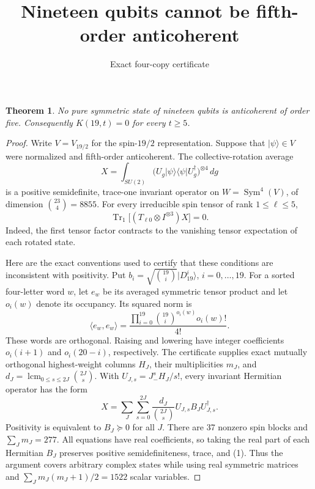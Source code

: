 \documentclass[11pt]{article}
\newtheorem{theorem}{Theorem}
\newcommand{\Tr}{\operatorname{Tr}}
\begin{document}
\title{Nineteen qubits cannot be fifth-order anticoherent}
\author{Exact four-copy certificate}
\date{}
\maketitle
\begin{theorem}
No pure symmetric state of nineteen qubits is anticoherent of order five.
Consequently $K(19,t)=0$ for every $t\geq5$.
\end{theorem}
\begin{proof}
Write $V=V_{19/2}$ for the spin-$19/2$ representation. Suppose that
$\lvert\psi\rangle\in V$ were normalized and fifth-order anticoherent.
The collective-rotation average
\[
 X=\int_{SU(2)} \bigl(U_g\lvert\psi\rangle\langle\psi\rvert U_g^\dagger\bigr)^{\otimes4}\,dg
\]
is a positive semidefinite, trace-one invariant operator on
$W=\operatorname{Sym}^4(V)$, of dimension $\binom{23}{4}=8855$.
For every irreducible spin tensor of rank $1\leq\ell\leq5$,
\[
 \Tr_1\bigl[(T_{\ell0}\otimes I^{\otimes3})X\bigr]=0. \tag{1}
\]
Indeed, the first tensor factor contracts to the vanishing tensor expectation
of each rotated state.

Here are the exact conventions used to certify that these conditions are
inconsistent with positivity. Put $b_i=\sqrt{\binom{19}{i}}\lvert D_{19}^i\rangle$,
$i=0,\ldots,19$. For a sorted four-letter word $w$, let $e_w$ be its averaged
symmetric tensor product and let $o_i(w)$ denote its occupancy. Its squared norm is
\[
 \langle e_w,e_w\rangle=
 \frac{\prod_{i=0}^{19}\binom{19}{i}^{o_i(w)}o_i(w)!}{4!}.
\]
These words are orthogonal. Raising and lowering have integer coefficients
$o_i(i+1)$ and $o_i(20-i)$, respectively. The certificate supplies exact
mutually orthogonal highest-weight columns $H_J$, their multiplicities $m_J$,
and $d_J=\operatorname{lcm}_{0\leq s\leq2J}\binom{2J}{s}$.
With $U_{J,s}=J_-^sH_J/s!$, every invariant Hermitian operator has the form
\[
 X=\sum_J\sum_{s=0}^{2J}\frac{d_J}{\binom{2J}{s}}
       U_{J,s}B_JU_{J,s}^{\dagger}.
\]
Positivity is equivalent to $B_J\succeq0$ for all $J$.
There are 37 nonzero spin blocks and $\sum_Jm_J=277$.
All equations have real coefficients, so taking the real part of each
Hermitian $B_J$ preserves positive semidefiniteness, trace, and (1).
Thus the argument covers arbitrary complex states while using real
symmetric matrices and $\sum_Jm_J(m_J+1)/2=1522$ scalar variables.


\end{proof}
\end{document}
